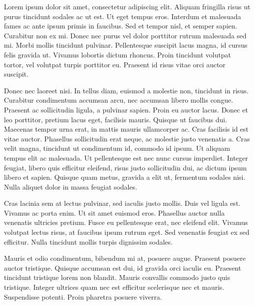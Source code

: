 Lorem ipsum dolor sit amet, consectetur adipiscing elit. Aliquam fringilla risus ut purus tincidunt sodales ac ut est. Ut eget tempus eros. Interdum et malesuada fames ac ante ipsum primis in faucibus. Sed et tempor nisl, et semper sapien. Curabitur non ex mi. Donec nec purus vel dolor porttitor rutrum malesuada sed mi. Morbi mollis tincidunt pulvinar. Pellentesque suscipit lacus magna, id cursus felis gravida ut. Vivamus lobortis dictum rhoncus. Proin tincidunt volutpat tortor, vel volutpat turpis porttitor eu. Praesent id risus vitae orci auctor suscipit.

Donec nec laoreet nisi. In tellus diam, euismod a molestie non, tincidunt in risus. Curabitur condimentum accumsan arcu, nec accumsan libero mollis congue. Praesent ac sollicitudin ligula, a pulvinar sapien. Proin eu auctor lacus. Donec et leo porttitor, pretium lacus eget, facilisis mauris. Quisque ut faucibus dui. Maecenas tempor urna erat, in mattis mauris ullamcorper ac. Cras facilisis id est vitae auctor. Phasellus sollicitudin erat neque, ac molestie justo venenatis a. Cras velit magna, tincidunt ut condimentum id, commodo id ipsum. Ut aliquam tempus elit ac malesuada. Ut pellentesque est nec nunc cursus imperdiet. Integer feugiat, libero quis efficitur eleifend, risus justo sollicitudin dui, ac dictum ipsum libero et sapien. Quisque quam metus, gravida a elit ut, fermentum sodales nisi. Nulla aliquet dolor in massa feugiat sodales.

Cras lacinia sem at lectus pulvinar, sed iaculis justo mollis. Duis vel ligula est. Vivamus ac porta enim. Ut sit amet euismod eros. Phasellus auctor nulla venenatis ultricies pretium. Fusce eu pellentesque erat, nec eleifend elit. Vivamus volutpat lectus risus, at faucibus ipsum rutrum eget. Sed venenatis feugiat ex sed efficitur. Nulla tincidunt mollis turpis dignissim sodales.

Mauris et odio condimentum, bibendum mi at, posuere augue. Praesent posuere auctor tristique. Quisque accumsan est dui, id gravida orci iaculis eu. Praesent tincidunt tristique lorem non blandit. Mauris convallis commodo justo quis tristique. Integer ultrices quam nec est efficitur scelerisque nec et mauris. Suspendisse potenti. Proin pharetra posuere viverra.